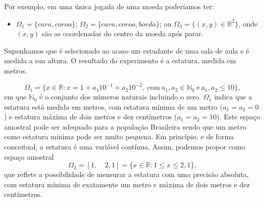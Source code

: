 \begin{frame}
%	
%	

%	
\begin{exem}
Por exemplo, em uma única jogada de uma moeda poderíamos ter:
\begin{itemize}
\item $\Omega_1=\{cara,coroa\}$; $\Omega_2=\{cara,coroa,borda\}$; ou $\Omega_3=\{(x,y)\in \mathbb{R}^2\}$, onde $(x,y)$ são as coordenadas do centro da moeda após parar.
\end{itemize}


\end{exem}

\begin{exem}
Suponhamos que é selecionado ao acaso um estudante de uma sala de aula e é medida a sua altura. O resultado do experimento é a estatura, medida em metros.

$$\Omega_1 = \{ x \in \mathbb{R}: x=1 + a_1 10^{-1} + a_2 10^{-2}, \ \text{com} \ a_1, a_2 \in \mathbb{N}_0 \ \text{e} \  a_1, a_2 \leq 10  \},$$  em que $\mathbb{N}_0$ é o conjunto dos números naturais incluindo o zero.  $\Omega_1$ indica que a estatura está medida em metros, com estatura mínima de um metro ($a_1=a_2=0$) e estatura máxima de dois metros e dez centímetros  ($a_1=a_2=10$). Este espaço amostral pode ser adequado para a população Brasileira sendo que um metro como estatura minima pode ser muito pequena. Em princípio, e de forma conceitual, a estatura é uma variável contínua. Assim, podemos propor como espaço amostral 
$$\Omega_2 = [1 , \quad 2,1]  = \{ x \in \mathbb{R}: 1\leq x \leq 2,1 \},$$ 
que reflete a possibilidade de mensurar a estatura com uma precisão absoluta,  com estatura mínima de exatamente um metro e máxima de dois metros e dez centímetros.
\end{exem}

\end{frame}

